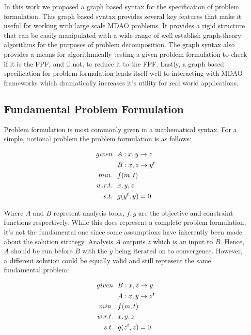     In this work we proposed a graph based syntax for the specification of problem formulation. This graph based syntax provides several key
    features that make it useful for working with large scale MDAO problems. It provides a rigid structure that can be easily manipulated 
    with a wide range of well establish graph-theory algorithms for the purposes of problem decomposition. The graph syntax also 
    provides a means for algorithmically testing a given problem formulation to check if it is the FPF, and if not, to reduce it to the FPF. 
    Lastly, a graph based specification for problem formulation lends itself well to interacting with MDAO frameworks which dramatically 
    increases it's utility for real world applications. 


\subsection{Fundamental Problem Formulation}
    Problem formulation is most commonly given in a mathematical syntax. For a simple, notional problem 
    the problem formulation is as follows: 

    \begin{align}
        given & \ \ A: {x,y} \rightarrow {z}
        \\      & \ \ B: {x,z} \rightarrow {y^t}
        \\min. &\ \ f(m,t) \notag
        \\w.r.t. & \ \ x,y,z \notag
        \\s.t. & \ \ g(y^t,y) = 0
        \label{eqn:simple}
    \end{align}

    Where $A$ and $B$ represent analysis tools, $f,g$ are the objective and constraint functions respectively. 
    While this does represent a complete problem formulation, 
    it's not the fundamental one since some assumptions have inherently been made about the solution 
    strategy. Analysis $A$ outputs $z$ which is an input to $B$. Hence, $A$ should be run before $B$ with 
    the $y$ being iterated on to convergence. However, a different solution could be equally valid and still represent
    the same fundamental problem: 

    \begin{align}
        given & \ \ B: {x,z} \rightarrow {y}
        \\      & \ \ A: {x,y} \rightarrow {z^t}
        \\min. &\ \ f(m,t) \notag
        \\w.r.t. & \ \ x,y,z \notag
        \\s.t. & \ \ g(z^t,z) = 0
        \label{eqn:simple2}
    \end{align}

